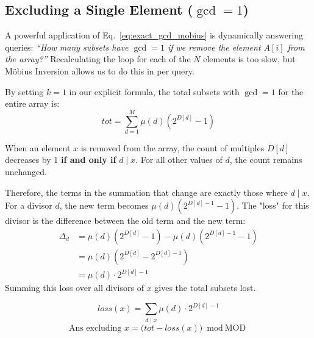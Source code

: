 \documentclass[11pt]{article}
\newcommand{\complexity}[1]{%
  \tcbox[on line, 
    colback=complbg, 
    colframe=compltext!50, 
    boxrule=0.5pt, 
    arc=2pt, 
    boxsep=0pt, 
    left=3pt, right=3pt, top=2pt, bottom=2pt
  ]{\color{compltext}\small\ensuremath{#1}}%
}
\begin{document}
\pagebreak
\subsection{Excluding a Single Element (\texorpdfstring{$\gcd = 1$}{gcd = 1})}

A powerful application of Eq.~\eqref{eq:exact_gcd_mobius} is dynamically answering queries: \textit{``How many subsets have $\gcd = 1$ if we remove the element $A[i]$ from the array?''}
Recalculating the \complexity{O(M \log M)} loop for each of the $N$ elements is too slow, but Möbius Inversion allows us to do this in \complexity{O(\sqrt{A[i]})} per query.

\begin{derivation}
    By setting $k=1$ in our explicit formula, the total subsets with $\gcd=1$ for the entire array is:
    \[ \mathit{tot} = \sum_{d=1}^M \mu(d) \left( 2^{D[d]} - 1 \right) \]

    When an element $x$ is removed from the array, the count of multiples $D[d]$ decreases by $1$ \textbf{if and only if} $d \mid x$. For all other values of $d$, the count remains unchanged.

    Therefore, the terms in the summation that change are exactly those where $d \mid x$.
    For a divisor $d$, the new term becomes $\mu(d)(2^{D[d]-1} - 1)$.
    The "loss" for this divisor is the difference between the old term and the new term:
    \begin{align*}
        \Delta_d & = \mu(d)(2^{D[d]} - 1) - \mu(d)(2^{D[d]-1} - 1) \\
                 & = \mu(d) \left( 2^{D[d]} - 2^{D[d]-1} \right)   \\
                 & = \mu(d) \cdot 2^{D[d]-1}
    \end{align*}
    Summing this loss over all divisors of $x$ gives the total subsets lost.
\end{derivation}

\begin{resultbox}
    \begin{equation}
        \mathit{loss}(x) = \sum_{d \mid x} \mu(d) \cdot 2^{D[d] - 1}
    \end{equation}
    \[ \text{Ans excluding } x = \big(\mathit{tot} - \mathit{loss}(x)\big) \bmod \text{MOD} \]
\end{resultbox}
\end{document}
